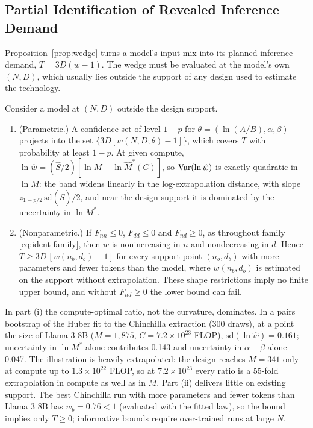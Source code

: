\subsection{Partial Identification of Revealed Inference Demand}\label{sec:ident-pi}

Proposition~\ref{prop:wedge} turns a model's input mix into its planned inference demand, $T=3D(w-1)$. The wedge must be
evaluated at the model's own $(N,D)$, which usually lies outside the support of any design used to estimate the
technology.

\begin{proposition}\label{prop:pi}
Consider a model at $(N,D)$ outside the design support.
\begin{enumerate}
\item[(i)] (Parametric.) A confidence set of level $1-p$ for $\theta=(\ln(A/B),\alpha,\beta)$ projects into the set
$\{3D[w(N,D;\theta)-1]\}$, which covers $T$ with probability at least $1-p$. At given compute,
$\ln\hat w=(\hat S/2)[\ln M-\ln\hat M^*(C)]$, so $\operatorname{Var}(\ln\hat w)$ is exactly quadratic in $\ln M$: the band widens
linearly in the log-extrapolation distance, with slope $z_{1-p/2}\,\mathrm{sd}(\hat S)/2$, and near the design support it
is dominated by the uncertainty in $\ln M^*$.
\item[(ii)] (Nonparametric.) If $F_{nn}\le0$, $F_{dd}\le0$ and $F_{nd}\ge0$, as throughout family
\eqref{eq:ident-family}, then $w$ is nonincreasing in $n$ and nondecreasing in $d$. Hence $T\ge3D\,[w(n_b,d_b)-1]$
for every support point $(n_b,d_b)$ with more parameters and fewer tokens than the model, where $w(n_b,d_b)$ is
estimated on the support without extrapolation. These shape restrictions
imply no finite upper bound, and without $F_{nd}\ge0$ the lower bound can fail.
\end{enumerate}
\end{proposition}

In part (i) the compute-optimal ratio, not the curvature, dominates. In a pairs bootstrap of the Huber fit to the
Chinchilla extraction (300 draws), at a point the size of Llama 3 8B ($M=1{,}875$, $C=7.2\times10^{23}$ FLOP),
$\mathrm{sd}(\ln\hat w)=0.161$; uncertainty in $\ln M^*$ alone contributes 0.143 and uncertainty in $\alpha+\beta$
alone 0.047. The illustration is heavily extrapolated: the design reaches $M=341$ only at compute up to
$1.3\times10^{22}$ FLOP, so at $7.2\times10^{23}$ every ratio is a 55-fold extrapolation in compute as well as in $M$.
Part (ii) delivers little on existing support. The best Chinchilla run with more parameters and fewer tokens than
Llama 3 8B has $w_b=0.76<1$ (evaluated with the fitted law), so the bound implies only $T\ge0$; informative bounds
require over-trained runs at large $N$.

